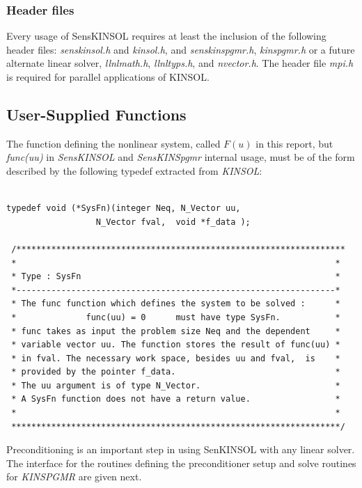 \documentclass[11pt]{article}
\begin{document}
\subsubsection{Header files}

Every usage of SensKINSOL requires at least the inclusion of the
following header files: {\em senskinsol.h} and {\em kinsol.h}, and {\em
senskinspgmr.h}, {\em kinspgmr.h} or a future alternate linear solver,
{\em llnlmath.h}, {\em llnltyps.h}, and {\em nvector.h}. The header
file {\em mpi.h} is required for parallel applications of KINSOL.


\subsection{User-Supplied Functions}

The function defining the nonlinear system, called $F(u)$ in this
report, but {\em func(uu)} in {\em SensKINSOL} and {\em SensKINSpgmr}
internal usage, must be of the form described by the following typedef
extracted from {\em KINSOL}:

\small
\begin{verbatim}

typedef void (*SysFn)(integer Neq, N_Vector uu,
                  N_Vector fval,  void *f_data );

 /******************************************************************
 *                                                                *
 * Type : SysFn                                                   *
 *----------------------------------------------------------------*
 * The func function which defines the system to be solved :      *
 *              func(uu) = 0      must have type SysFn.           *
 * func takes as input the problem size Neq and the dependent     *
 * variable vector uu. The function stores the result of func(uu) *
 * in fval. The necessary work space, besides uu and fval,  is    *
 * provided by the pointer f_data.                                *
 * The uu argument is of type N_Vector.                           *
 * A SysFn function does not have a return value.                 *
 *                                                                *
 ******************************************************************/

\end{verbatim}
\normalsize

Preconditioning is an important step in using SenKINSOL with any linear
solver. The interface for the routines defining the preconditioner
setup and solve routines for {\em KINSPGMR} are given next.
\end{document}
